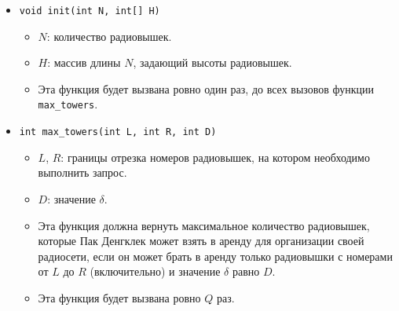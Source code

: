 \begin{itemize}
    \item \texttt{void init(int N, int[] H)}
\begin{itemize}


\item $N$: количество радиовышек.
\item $H$: массив длины $N$, задающий высоты радиовышек.
\item Эта функция будет вызвана ровно один раз, до всех вызовов функции \texttt{max\_towers}.
\end{itemize}
\item \texttt{int max\_towers(int L, int R, int D)}
\begin{itemize}

\item $L$, $R$: границы отрезка номеров радиовышек, на котором необходимо выполнить запрос.
\item $D$: значение $\delta$.
\item Эта функция должна вернуть максимальное количество радиовышек, которые Пак Денгклек может взять в аренду для организации своей радиосети, если он может брать в аренду только радиовышки с номерами от $L$ до $R$ (включительно) и значение $\delta$ равно $D$.
\item Эта функция будет вызвана ровно $Q$ раз.
\end{itemize}
\end{itemize}